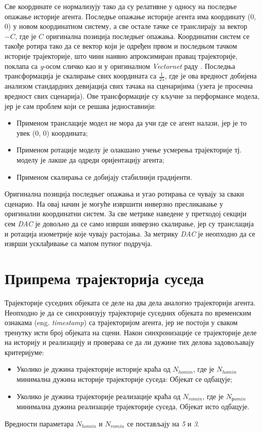 \documentclass[11pt,oneside]{memoir}
\begin{document}
Све координате се нормализују тако да су релативне у односу на последње опажање историје агента. Последње опажање историје
агента има координату (0, 0) у новом координатном систему, а све остале тачке се транслирају за вектор $-C$, где је $C$ оригинална позиција
последњег опажања. Координатни систем се такође ротира тако да се вектор који је одређен првом и последњом тачком историје трајекторије,
што чини наивно апроксимиран правац трајекторије, поклапа са \textit{y}-осом сличко као и у оригиналном \textit{Vectornet} раду \cite{vectornet}. Последња
трансформација је скалирање свих координата са $\frac{1}{25}$, где је ова вредност добијена анализом стандардних девијација свих тачака
на сценаријима (узета је просечна вредност свих сценарија). Ове трансформације су кључне за перформансе модела, јер је сам проблем који се решава
једноставнији:
\begin{itemize}
  \item Применом транслације модел не мора да учи где се агент налази, јер је то увек (0, 0) координата;
  \item Применом ротације моделу је олакшано учење усмерења трајекторије тј. моделу је лакше да одреди оријентацију агента;
  \item Применом скалирања се добијају стабилнији градијенти.
\end{itemize}
Оригинална позиција последњег опажања и угао ротирања се чувају за сваки сценарио. На овај начин је могуће извршити
инверзно пресликавање у оригинални координатни систем. За све метрике наведене у претходој секцији сем \textit{DAC} је довољно
да се само изврши инверзно скалирање, јер су транслација и ротација изометрије које чувају растојања. За метрику \textit{DAC} је 
неопходно да се изврши усклађивање са мапом путног подручја.

\section{Припрема трајекторија суседа}

Трајекторије суседних објеката се деле на два дела аналогно трајекторији агента. Неопходно је да се синхронизују трајекторије 
суседних објеката по временским ознакама (eng. \textit{timestamp}) са трајекторијом агента, јер не постоји у сваком тренутку исти
број објеката на сцени. Након синхронизације се трајекторије деле на историју и реализацију и проверава се да ли дужине тих
делова задовољавају критеријуме:
\begin{itemize}
  \item Уколико је дужина трајекторије историје краћа од $N_{homin}$, где је $N_{homin}$ минимална дужина историје трајекторије суседа: 
        Објекат се одбацује;
  \item Уколико је дужина трајекторије реализације краћа од $N_{romin}$, где је $N_{рomin}$ минимална дужина реализације трајекторије суседа, Објекат исто одбацује.
\end{itemize}
Вредности параметара $N_{homin}$ и $N_{romin}$ се постављају на \textit{5} и \textit{3}.
\end{document}
